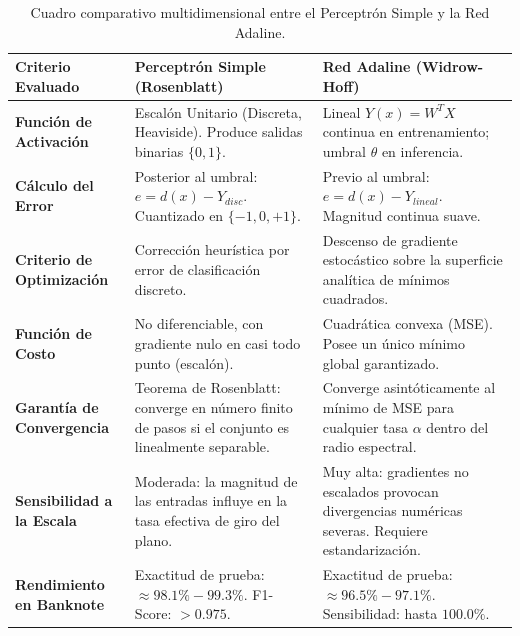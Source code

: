 \documentclass{article}
\begin{document}
\begin{table}[H]
\centering
\caption{Cuadro comparativo multidimensional entre el Perceptrón Simple y la Red Adaline.}
\label{tab:cuadro_comparativo}
\begin{tabularx}{\textwidth}{p{3.3cm} X X}
\toprule
\textbf{Criterio Evaluado} & \textbf{Perceptrón Simple (Rosenblatt)} & \textbf{Red Adaline (Widrow-Hoff)} \\
\midrule
\textbf{Función de Activación} & Escalón Unitario (Discreta, Heaviside). Produce salidas binarias $\{0, 1\}$. & Lineal $Y(x) = W^T X$ continua en entrenamiento; umbral $\theta$ en inferencia. \\
\addlinespace
\textbf{Cálculo del Error} & Posterior al umbral: $e = d(x) - Y_{disc}$. Cuantizado en $\{-1, 0, +1\}$. & Previo al umbral: $e = d(x) - Y_{lineal}$. Magnitud continua suave. \\
\addlinespace
\textbf{Criterio de Optimización} & Corrección heurística por error de clasificación discreto. & Descenso de gradiente estocástico sobre la superficie analítica de mínimos cuadrados. \\
\addlinespace
\textbf{Función de Costo} & No diferenciable, con gradiente nulo en casi todo punto (escalón). & Cuadrática convexa (MSE). Posee un único mínimo global garantizado. \\
\addlinespace
\textbf{Garantía de Convergencia} & Teorema de Rosenblatt: converge en número finito de pasos si el conjunto es linealmente separable. & Converge asintóticamente al mínimo de MSE para cualquier tasa $\alpha$ dentro del radio espectral. \\
\addlinespace
\textbf{Sensibilidad a la Escala} & Moderada: la magnitud de las entradas influye en la tasa efectiva de giro del plano. & Muy alta: gradientes no escalados provocan divergencias numéricas severas. Requiere estandarización. \\
\addlinespace
\textbf{Rendimiento en Banknote} & Exactitud de prueba: $\approx 98.1\% - 99.3\%$. F1-Score: $> 0.975$. & Exactitud de prueba: $\approx 96.5\% - 97.1\%$. Sensibilidad: hasta $100.0\%$. \\
\bottomrule
\end{tabularx}
\end{table}

\end{document}
